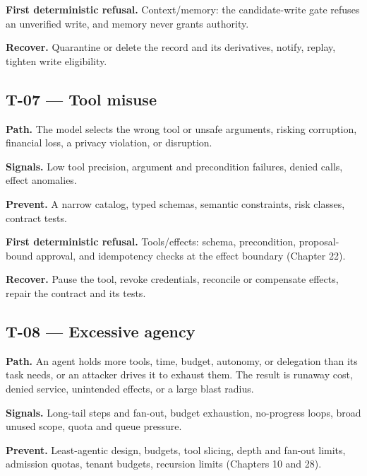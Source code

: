\textbf{First deterministic refusal.} Context/memory: the candidate-write gate refuses an unverified write, and memory never grants authority.\par

\textbf{Recover.} Quarantine or delete the record and its derivatives, notify, replay, tighten write eligibility.\par

\subsection{T-07 — Tool misuse}

\textbf{Path.} The model selects the wrong tool or unsafe arguments, risking corruption, financial loss, a privacy violation, or disruption.\par

\textbf{Signals.} Low tool precision, argument and precondition failures, denied calls, effect anomalies.\par

\textbf{Prevent.} A narrow catalog, typed schemas, semantic constraints, risk classes, contract tests.\par

\textbf{First deterministic refusal.} Tools/effects: schema, precondition, proposal-bound approval, and idempotency checks at the effect boundary (Chapter 22).\par

\textbf{Recover.} Pause the tool, revoke credentials, reconcile or compensate effects, repair the contract and its tests.\par

\subsection{T-08 — Excessive agency}

\textbf{Path.} An agent holds more tools, time, budget, autonomy, or delegation than its task needs, or an attacker drives it to exhaust them. The result is runaway cost, denied service, unintended effects, or a large blast radius.\par

\textbf{Signals.} Long-tail steps and fan-out, budget exhaustion, no-progress loops, broad unused scope, quota and queue pressure.\par

\textbf{Prevent.} Least-agentic design, budgets, tool slicing, depth and fan-out limits, admission quotas, tenant budgets, recursion limits (Chapters 10 and 28).\par


